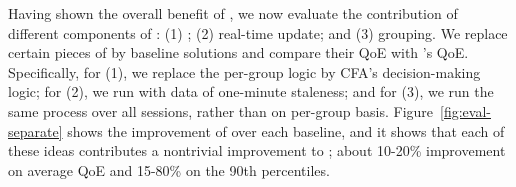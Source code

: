 


Having shown the overall benefit of \name, we now evaluate the contribution of different components of \name: (1) \mab;
 (2)  real-time update; and  (3) grouping. 
We replace certain pieces of \name by baseline solutions and compare their QoE with \name's QoE.
 Specifically, for (1), we replace the per-group \mab logic by CFA's decision-making logic; 
for (2), we run  \name with  data of one-minute staleness; and for (3), 
 we run the same \mab process over all sessions, rather than on per-group basis.
Figure~\ref{fig:eval-separate} shows the improvement of \name over each baseline, and it shows that each of these ideas contributes a nontrivial improvement to \name; about 10-20\% improvement on average QoE and 15-80\% on the 90th percentiles. 

